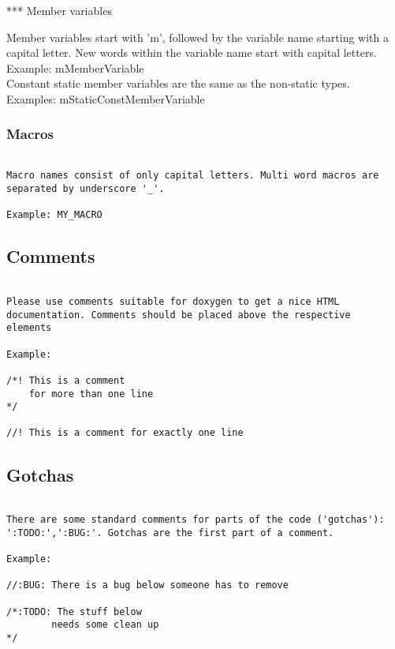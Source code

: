 *** Member variables

Member variables start with 'm', followed by the variable name
starting with a capital letter. New words within the variable name
start with capital letters.
\\

Example: mMemberVariable
\\

Constant static member variables are the same as the
non-static types. 
\\

Examples: mStaticConstMemberVariable

\subsubsection{Macros}
\begin{verbatim}

Macro names consist of only capital letters. Multi word macros are
separated by underscore '_'.

Example: MY_MACRO

\end{verbatim}
\subsection{Comments}
\begin{verbatim}

Please use comments suitable for doxygen to get a nice HTML
documentation. Comments should be placed above the respective
elements

Example:

/*! This is a comment 
    for more than one line
*/

//! This is a comment for exactly one line

\end{verbatim}
\subsection{Gotchas}
\begin{verbatim}

There are some standard comments for parts of the code ('gotchas'): 
':TODO:',':BUG:'. Gotchas are the first part of a comment.

Example:

//:BUG: There is a bug below someone has to remove

/*:TODO: The stuff below
        needs some clean up
*/

\end{verbatim}
